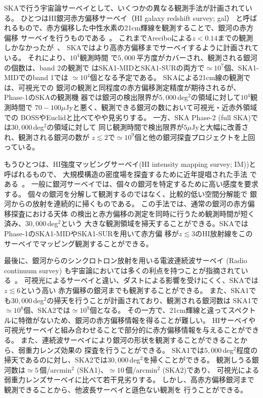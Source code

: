 SKAで行う宇宙論サーベイとして、いくつかの異なる観測手法が計画されている。
ひとつはHI銀河赤方偏移サーベイ（HI galaxy redshift survey; gal）
と呼ばれるもので、赤方偏移した中性水素の21cm輝線を観測することで、銀河の赤方偏移
サーベイを行うものである~\citep{Abdalla:2015kra}。
これまでAreciboによる$z<0.14$までの観測しかなかったが~\citep{Freudling:2010ds}、
SKAではより高赤方偏移までサーベイするように計画されている。
それにより、$10^4$観測時間
で$5,000~$平方度がカバーされ、観測される銀河の個数は、band 2の観測で
はSKA1-MIDとSKA1-SURの両方で$\simeq 10^7$個、SKA1-MIDでのband 1では
$\simeq 10^4$個となる予定である。
SKAによる21cm線の観測では、可視光での
銀河の観測と同程度の赤方偏移測定精度が期待されるが、Phase-1のSKAの観測機
器では銀河の検出限界が$5,000\,$deg$^2$の領域に対して$10^4$観測時間で
$70-100\mu$Jyと悪く、観測できる銀河の数において可視光・近赤外領域での
BOSSやEuclidと比べてやや見劣りする。
一方、SKA Phase-2 (full SKA)では$30,000\,$deg$^2$の領域に対して
同じ観測時間で検出限界が$5\mu$Jyと大幅に改善され、観測される銀河の数が
$z\lesssim 2$で$\simeq 10^9$個と他の銀河探査プロジェクトを上回っている。

もうひとつは、HI強度マッピングサーベイ(HI intensity mapping survey; IM))と
呼ばれるもので、
大規模構造の密度場を探査するために近年提唱された手法
である~\citep{Santos:2015gra,Battye:2004re,Wyithe:2007gz,Chang:2007xk,Peterson:2009ka}。
一般に銀河サーベイでは、個々の銀河を特定するために高い感度を要求する。
個々の銀河を分解して観測するのではなく、比較的低い空間分解能で
銀河からの放射を連続的に掃くものである。
この手法では、通常の銀河の赤方偏移探査における天体
の検出と赤方偏移の測定を同時に行うため観測時間が短く済み、$30,000\,$deg$^2$という
大きな観測領域を掃天することができる。SKAではPhase-1のSKA1-MIDやSKA1-SURを用いて赤方偏
移が$z\lesssim 3$のHI放射線をこのサーベイでマッピング観測することができる。

最後に、銀河からのシンクロトロン放射を用いる電波連続波サーベイ (Radio continuum survey)
も宇宙論においては多くの利点を持つことが指摘されている~\citep{Jarvis:2015tqa}。
可視光によるサーベイと違い、ダストによる影響を受けにくく、SKAでは$z\lesssim 6$という高い
赤方偏移の銀河までも観測することができる。
また、SKA1でも$30,000\,$deg$^2$の掃天を行うことが計画されており、観測される銀河数は
SKA1で$\simeq 10^8$個、SKA2では$\simeq 10^9$個となる。
その一方で、21cm輝線と違ってスペクトルに特徴がないため、銀河の赤方偏移情報を得ることが難しい。
HIサーベイや可視光サーベイと組み合わせることで部分的に赤方偏移情報を与えることができる。
また、連続波サーベイにより銀河の形状を観測することができることから、弱重力レンズ効果の
探査を行うことができる。
SKA1では$5,000\,$deg$^2$程度の掃天であるのに対し、SKA2では$30,000\,$deg$^2$を掃くことができる。
観測しうる銀河数は$\simeq 5\,$個/arcmin$^{2}$ (SKA1)、$\simeq 10\,$個/arcmin$^2$ (SKA2)であり、
可視光による弱重力レンズサーベイに比べて若干見劣りする。
しかし、高赤方偏移銀河まで観測できることから、他波長サーベイと遜色ない観測を
行うことができる。

